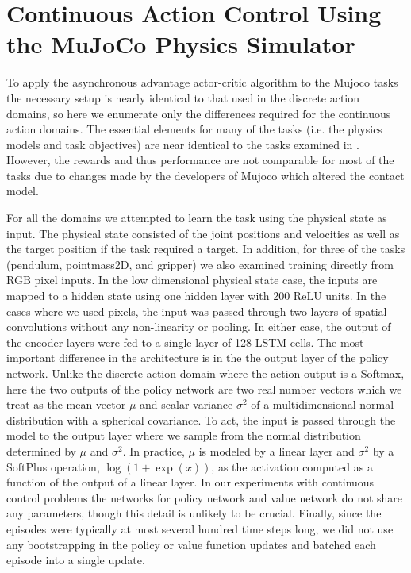 %

\section{Continuous Action Control Using the MuJoCo Physics Simulator}
\label{sec:mujoco}

%
%
%
%
%
%
%
%
%
%
%
%
%
%
%
%
%
%
%
%
%
%
%
%
%
%
%
%
%
%
%
%
%
%
%
%
%
%
%
%
%

%
%
%
%
%
%
%
%
%
%
%
%
%
%
%

%
%
%
%
%
%
%
%
%
%

To apply the asynchronous advantage actor-critic algorithm to the Mujoco tasks the
necessary setup is nearly identical to that used in the discrete action domains, so
here we enumerate only the differences required for the continuous action domains.
The essential elements for many of the tasks (i.e. the physics models and task objectives)
are near identical to the tasks examined in \citep{lillicrap2015continuous}.
However, the rewards and thus performance are not comparable for most of the tasks due to
changes made by the developers of Mujoco which altered the contact model.

%
For all the domains we attempted to learn the task using the physical state as input.
The physical state consisted of the joint positions and velocities as well
as the target position if the task required a target.
In addition, for three of the tasks (pendulum, pointmass2D, and gripper) we also examined
training directly from RGB pixel inputs.
In the low dimensional physical state case, the inputs are mapped to a hidden state using one hidden layer with 200 ReLU units.
In the cases where we used pixels, the input was passed through two layers of spatial convolutions without any non-linearity or pooling.
In either case, the output of the encoder layers were fed to a single layer of 128 LSTM cells.
The most important difference in the architecture is in the the output layer of the policy
network. Unlike the discrete action domain where the action output is a Softmax, here the two outputs
of the policy network are two real number vectors which we treat
as the mean vector $\mu$ and scalar variance $\sigma^2$ of a multidimensional normal distribution
with a spherical covariance.
To act, the input is passed through the model to the output layer where we sample from the
normal distribution determined by $\mu$ and $\sigma^2$.
In practice, $\mu$ is modeled by a linear layer and $\sigma^2$ by a SoftPlus operation, $\log (1 + \exp (x))$,
as the activation computed as a function of the output of a linear layer.
In our experiments with continuous control problems the networks for policy network
and value network do not share any parameters, though this detail is unlikely to be crucial.
Finally, since the episodes were typically at most several hundred time steps long, we
did not use any bootstrapping in the policy or value function updates and batched each episode
into a single update.


